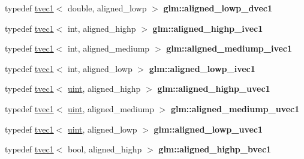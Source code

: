 \begin{DoxyCompactItemize}
typedef \hyperlink{structglm_1_1tvec1}{tvec1}$<$ double, aligned\+\_\+lowp $>$ {\bfseries glm\+::aligned\+\_\+lowp\+\_\+dvec1}
\item 
\mbox{\label{group__gtc__type__aligned_gaebfad60737b3a3ec596dc0341ed538c3}} 
typedef \hyperlink{structglm_1_1tvec1}{tvec1}$<$ int, aligned\+\_\+highp $>$ {\bfseries glm\+::aligned\+\_\+highp\+\_\+ivec1}
\item 
\mbox{\label{group__gtc__type__aligned_gaecd25bdc3dfe93926b540eff3a8a2e5c}} 
typedef \hyperlink{structglm_1_1tvec1}{tvec1}$<$ int, aligned\+\_\+mediump $>$ {\bfseries glm\+::aligned\+\_\+mediump\+\_\+ivec1}
\item 
\mbox{\label{group__gtc__type__aligned_ga3688074e5264a94d6671a6218fd2e6a4}} 
typedef \hyperlink{structglm_1_1tvec1}{tvec1}$<$ int, aligned\+\_\+lowp $>$ {\bfseries glm\+::aligned\+\_\+lowp\+\_\+ivec1}
\item 
\mbox{\label{group__gtc__type__aligned_ga14fec93434c0b98ff5318e49a1ae9185}} 
typedef \hyperlink{structglm_1_1tvec1}{tvec1}$<$ \hyperlink{group__core__precision_ga4fd29415871152bfb5abd588334147c8}{uint}, aligned\+\_\+highp $>$ {\bfseries glm\+::aligned\+\_\+highp\+\_\+uvec1}
\item 
\mbox{\label{group__gtc__type__aligned_gaacb67fc981364f5615b4235ed56e1be2}} 
typedef \hyperlink{structglm_1_1tvec1}{tvec1}$<$ \hyperlink{group__core__precision_ga4fd29415871152bfb5abd588334147c8}{uint}, aligned\+\_\+mediump $>$ {\bfseries glm\+::aligned\+\_\+mediump\+\_\+uvec1}
\item 
\mbox{\label{group__gtc__type__aligned_gab370245153f6b995068aac82bfb31ed6}} 
typedef \hyperlink{structglm_1_1tvec1}{tvec1}$<$ \hyperlink{group__core__precision_ga4fd29415871152bfb5abd588334147c8}{uint}, aligned\+\_\+lowp $>$ {\bfseries glm\+::aligned\+\_\+lowp\+\_\+uvec1}
\item 
\mbox{\label{group__gtc__type__aligned_ga3e78791d8be2a1766bc7bc9d666f0f7f}} 
typedef \hyperlink{structglm_1_1tvec1}{tvec1}$<$ bool, aligned\+\_\+highp $>$ {\bfseries glm\+::aligned\+\_\+highp\+\_\+bvec1}

\end{DoxyCompactItemize}
